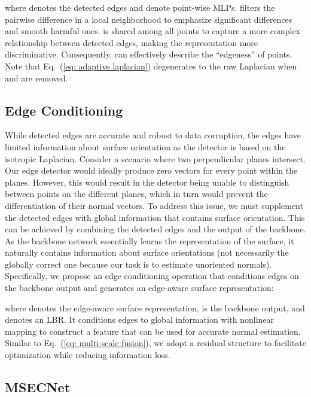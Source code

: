 \documentclass[sigconf]{acmart}
\begin{document}
where  denotes the detected edges and  denote point-wise MLPs.  filters the pairwise difference in a local neighborhood to emphasize significant differences and smooth harmful ones. 
 is shared among all points to capture a more complex relationship between detected edges, making the representation more discriminative.   
Consequently,  can effectively describe the ``edgeness'' of points. Note that Eq.~(\ref{eq: adaptive laplacian}) degenerates to the raw Laplacian when  and  are removed.


\subsection{Edge Conditioning}\label{sec: edge conditioning}
While detected edges are accurate and robust to data corruption, the edges have limited information about surface orientation as the detector is based on the isotropic Laplacian.
Consider a scenario where two perpendicular planes intersect. Our edge detector would ideally produce zero vectors for every point within the planes. However, this would result in the detector being unable to distinguish between points on the different planes, which in turn would prevent the differentiation of their normal vectors.
To address this issue, we must supplement the detected edges with global information that contains surface orientation. This can be achieved by combining the detected edges and the output of the backbone. As the backbone network essentially learns the representation of the surface, it naturally contains information about surface orientations (not necessarily the globally correct one because our task is to estimate unoriented normals). 
Specifically, we propose an edge conditioning operation that conditions edges on the backbone output and generates an edge-aware surface representation:

where  denotes the edge-aware surface representation,  is the backbone output, and  denotes an LBR. It conditions edges to global information with nonlinear mapping to construct a feature that can be used for accurate normal estimation. Similar to Eq.~(\ref{eq: multi-scale fusion}), we adopt a residual structure to facilitate optimization while reducing information loss.   


\subsection{MSECNet}\label{sec: arch}
\indent 
\end{document}
